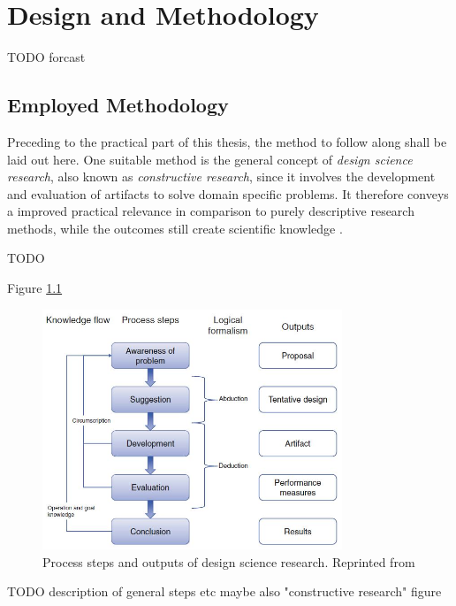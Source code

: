 \chapter{Design and Methodology}
\label{chap:design}
TODO forcast



\section{Employed Methodology}

Preceding to the practical part of this thesis, 
the method to follow along shall be laid out here.
One suitable method is the general concept of \emph{design science research}, also known as \emph{constructive research}, 
since it involves the development and evaluation of artifacts to solve domain specific problems.
It therefore conveys a improved practical relevance in comparison to purely descriptive research methods,
while the outcomes still create scientific knowledge
\autocite[][p.~v]{dresh2015designresearch}.

TODO

Figure \ref{fig:design:designscience}

\begin{figure}[hbt]
	\centering
	\includegraphics[width=0.8\textwidth, keepaspectratio]{resources/designscienceresearchoutputs.jpg}
	\caption{\label{fig:design:designscience} Process steps and outputs of design science research. Reprinted from \textcite[][p.~83]{dresh2015designresearch}}
\end{figure}

TODO description of general steps etc
maybe also "constructive research" figure


